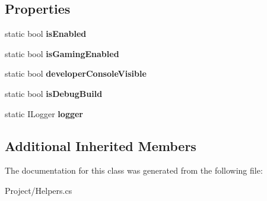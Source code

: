 \subsection*{Properties}
\begin{DoxyCompactItemize}
\item 
\mbox{\label{class_lerp2_a_p_i_1_1_debug_handler_1_1_debug_ad0301aad2131db2f7819a9540d4d871a}} 
static bool {\bfseries is\+Enabled}
\item 
\mbox{\label{class_lerp2_a_p_i_1_1_debug_handler_1_1_debug_a78ac4ca0732c2a99346f20c484f13ce8}} 
static bool {\bfseries is\+Gaming\+Enabled}
\item 
\mbox{\label{class_lerp2_a_p_i_1_1_debug_handler_1_1_debug_ab342aa666f1fbbcd2ede4e5e4d6fa657}} 
static bool {\bfseries developer\+Console\+Visible}
\item 
\mbox{\label{class_lerp2_a_p_i_1_1_debug_handler_1_1_debug_a16fba23a422ad68440aac564685129a6}} 
static bool {\bfseries is\+Debug\+Build}
\item 
\mbox{\label{class_lerp2_a_p_i_1_1_debug_handler_1_1_debug_a4ce07638cfff9dd048f9db180d3586e0}} 
static I\+Logger {\bfseries logger}
\end{DoxyCompactItemize}
\subsection*{Additional Inherited Members}


The documentation for this class was generated from the following file\+:\begin{DoxyCompactItemize}
\item 
Project/Helpers.\+cs\end{DoxyCompactItemize}

